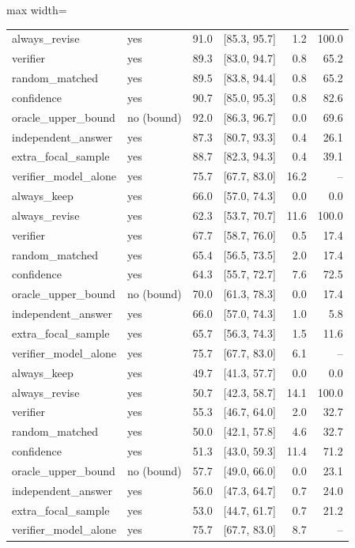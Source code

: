 \begin{table}[t]
\begin{adjustbox}{max width=\linewidth}
\begin{tabular}{@{}llrrrr@{}}
always\_revise & yes & 91.0 & [85.3, 95.7] & 1.2 & 100.0 \\
verifier & yes & 89.3 & [83.0, 94.7] & 0.8 & 65.2 \\
random\_matched & yes & 89.5 & [83.8, 94.4] & 0.8 & 65.2 \\
confidence & yes & 90.7 & [85.0, 95.3] & 0.8 & 82.6 \\
oracle\_upper\_bound & no (bound) & 92.0 & [86.3, 96.7] & 0.0 & 69.6 \\
independent\_answer & yes & 87.3 & [80.7, 93.3] & 0.4 & 26.1 \\
extra\_focal\_sample & yes & 88.7 & [82.3, 94.3] & 0.4 & 39.1 \\
verifier\_model\_alone & yes & 75.7 & [67.7, 83.0] & 16.2 & -- \\
always\_keep & yes & 66.0 & [57.0, 74.3] & 0.0 & 0.0 \\
always\_revise & yes & 62.3 & [53.7, 70.7] & 11.6 & 100.0 \\
verifier & yes & 67.7 & [58.7, 76.0] & 0.5 & 17.4 \\
random\_matched & yes & 65.4 & [56.5, 73.5] & 2.0 & 17.4 \\
confidence & yes & 64.3 & [55.7, 72.7] & 7.6 & 72.5 \\
oracle\_upper\_bound & no (bound) & 70.0 & [61.3, 78.3] & 0.0 & 17.4 \\
independent\_answer & yes & 66.0 & [57.0, 74.3] & 1.0 & 5.8 \\
extra\_focal\_sample & yes & 65.7 & [56.3, 74.3] & 1.5 & 11.6 \\
verifier\_model\_alone & yes & 75.7 & [67.7, 83.0] & 6.1 & -- \\
always\_keep & yes & 49.7 & [41.3, 57.7] & 0.0 & 0.0 \\
always\_revise & yes & 50.7 & [42.3, 58.7] & 14.1 & 100.0 \\
verifier & yes & 55.3 & [46.7, 64.0] & 2.0 & 32.7 \\
random\_matched & yes & 50.0 & [42.1, 57.8] & 4.6 & 32.7 \\
confidence & yes & 51.3 & [43.0, 59.3] & 11.4 & 71.2 \\
oracle\_upper\_bound & no (bound) & 57.7 & [49.0, 66.0] & 0.0 & 23.1 \\
independent\_answer & yes & 56.0 & [47.3, 64.7] & 0.7 & 24.0 \\
extra\_focal\_sample & yes & 53.0 & [44.7, 61.7] & 0.7 & 21.2 \\
verifier\_model\_alone & yes & 75.7 & [67.7, 83.0] & 8.7 & -- \\
\bottomrule
\end{tabular}
\end{adjustbox}
\end{table}
